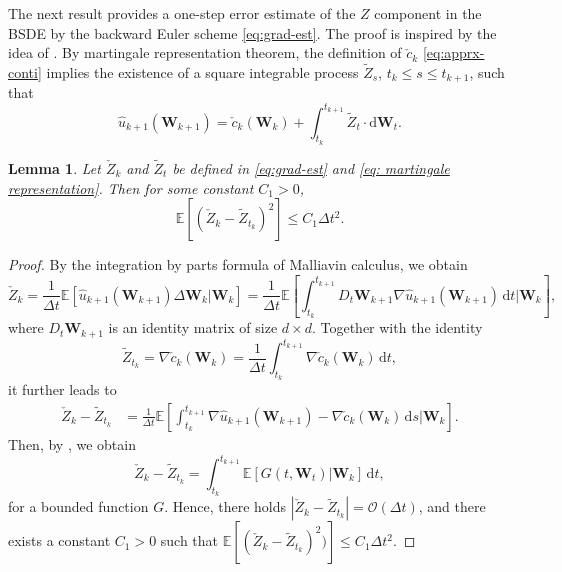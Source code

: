 \documentclass[10pt,a4paper]{amsart}
\numberwithin{equation}{section}
\numberwithin{algorithm}{section}
\theoremstyle{plain}
\newtheorem{lemma}[lemma]{Lemma}
\theoremstyle{remark}
\newcommand{\dd}{\mathrm{d}}
\begin{document}
The next result provides a one-step error estimate of the $Z$ component in the BSDE by the backward Euler scheme \cref{eq:grad-est}. The proof is inspired by the idea of \cite[pages 816-817]{gobet2007error}.
By martingale representation theorem, the definition of $\check{c}_k$ \cref{eq:apprx-conti} implies the existence of a square integrable process $\tilde{Z}_s$, $t_k\le s\le t_{k+1}$, such that
\begin{equation} \label{eq: martingale representation}
    \hat{u}_{k+1}(\mathbf{W}_{k+1}) = \check{c}_k(\mathbf{W}_k) + \int_{t_k}^{t_{k+1}} \tilde{Z}_t \cdot \dd \mathbf{W}_t.
\end{equation}
\begin{lemma} \label{lem:one-step Z}
Let $\check{Z}_k$ and $\tilde{Z}_t$ be defined in \cref{eq:grad-est} and \cref{eq: martingale representation}. Then for some constant $C_1>0$, \begin{equation*}
        \mathbb{E}\left[ (\check{Z}_k - \tilde{Z}_{t_k})^2 \right] \le C_1 \Delta t^2.
    \end{equation*}
\end{lemma}
\begin{proof}
By the integration by parts formula of Malliavin calculus, we obtain
    \begin{equation*}
        \check{Z}_k = \frac{1}{\Delta t} \mathbb{E}\left[ \hat{u}_{k+1}(\mathbf{W}_{k+1}) \Delta \mathbf{W}_k | \mathbf{W}_k \right] = \frac{1}{\Delta t} \mathbb{E}\left[ \int_{t_k}^{t_{k+1}} D_t\mathbf{W}_{k+1} \nabla \hat{u}_{k+1}(\mathbf{W}_{k+1}) \,\dd t \bigg| \mathbf{W}_k \right],
    \end{equation*}
    where $D_t \mathbf{W}_{k+1}$ is an identity matrix of size $d\times d$.
Together with the identity
    \begin{equation*}
        \tilde{Z}_{t_k} = \nabla \check{c}_k(\mathbf{W}_k) = \frac{1}{\Delta t}\int_{t_k}^{t_{k+1}} \nabla \check{c}_k(\mathbf{W}_k) \,\dd t,
    \end{equation*}
it further leads to
    \begin{align*}
        \check{Z}_k - \tilde{Z}_{t_k} &= \frac{1}{\Delta t}\mathbb{E}\left[ \int_{t_k}^{t_{k+1}} \nabla \hat{u}_{k+1}(\mathbf{W}_{k+1}) - \nabla \check{c}_k(\mathbf{W}_k) \,\dd s \bigg| \mathbf{W}_k \right].
    \end{align*}
Then, by \cite[Equation (26)]{gobet2007error}, we obtain
    \begin{equation*}
        \check{Z}_k - \tilde{Z}_{t_k} = \int_{t_k}^{t_{k+1}} \mathbb{E}\left[ G(t, \mathbf{W}_t) |\mathbf{W}_k \right] \,\dd t,
    \end{equation*}
    for a bounded function $G$. Hence, there holds $|\check{Z}_k - \tilde{Z}_{t_k}| = \mathcal{O}(\Delta t)$, and there exists a constant $C_1>0$ such that $\mathbb{E}\left[ (\check{Z}_k - \tilde{Z}_{t_k})^2) \right] \le C_1 \Delta t^2$.
\end{proof}
\end{document}
